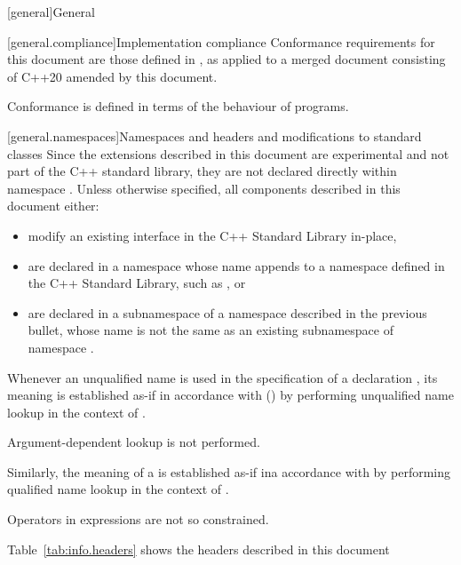 [general]{General}

[general.compliance]{Implementation compliance}
\pnum
Conformance requirements for this document are those defined in , as applied to a merged document consisting of C++20 amended by this document.
\begin{note}
Conformance is defined in terms of the behaviour of programs.\end{note}

[general.namespaces]{Namespaces and headers and modifications to standard classes}
\pnum
Since the extensions described in this document are experimental and not part of the C++ standard library, they are not declared directly within namespace . Unless otherwise specified, all components described in this document either:

\begin{itemize}
    \item modify an existing interface in the C++ Standard Library in-place,
    \item are declared in a namespace whose name appends  to a namespace defined in the C++ Standard Library, such as , or
    \item are declared in a subnamespace of a namespace described in the previous bullet, whose name is not the same as an existing subnamespace of namespace .
\end{itemize}

\pnum
Whenever an unqualified name is used
in the specification of a declaration ,
its meaning is established
as-if in accordance with () by performing unqualified name lookup
in the context of .
\begin{note}
Argument-dependent lookup is not performed.\end{note}
Similarly, the meaning of a  is established
as-if ina accordance with  by performing qualified name lookup
in the context of .
\begin{note}
Operators in expressions are not so constrained.\end{note}

\pnum
Table~\ref{tab:info.headers} shows the headers described in this document



